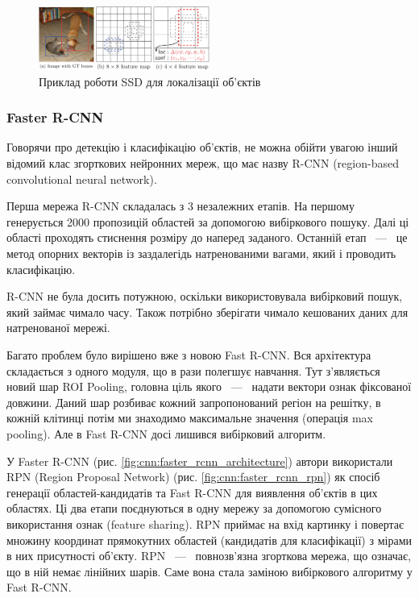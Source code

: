 \begin{figure}[H]
    \centering
    \includegraphics[width=0.5\textwidth]{images/cnn_ssd_work_example}
    \caption{Приклад роботи SSD для локалізації об'єктів \cite{bib:ssd}
        \label{fig:cnn:ssd_work_example}
    }
\end{figure}


\subsubsection{Faster R-CNN}

Говорячи про детекцію і класифікацію об'єктів, не можна обійти увагою інший відомий
клас згорткових нейронних мереж, що має назву R-CNN (region-based convolutional neural network).

Перша мережа R-CNN складалась з 3 незалежних етапів.
На першому генерується 2000 пропозицій областей за допомогою
вибіркового пошуку. Далі ці області проходять стиснення розміру до наперед заданого.
Останній етап ~---~ це метод опорних векторів із заздалегідь натренованими
вагами, який і проводить класифікацію.

R-CNN не була досить потужною, оскільки використовувала вибірковий пошук,
який займає чимало часу. Також потрібно зберігати чимало
кешованих даних для натренованої мережі.

Багато проблем було вирішено вже з новою Fast R-CNN. Вся архітектура складається з одного модуля,
що в рази полегшує навчання. Тут з'являється новий шар ROI Pooling, головна ціль якого ~---~
надати вектори ознак фіксованої довжини. Даний шар розбиває кожний запропонований
регіон на решітку, в кожній клітинці потім ми знаходимо максимальне значення
(операція max pooling). Але в Fast R-CNN досі
лишився вибірковий алгоритм.

У Faster R-CNN \cite{bib:faster_rcnn} (рис. \ref{fig:cnn:faster_rcnn_architecture}) автори 
використали RPN (Region Proposal Network) (рис. \ref{fig:cnn:faster_rcnn_rpn}) 
як спосіб генерації областей-кандидатів та Fast R-CNN для виявлення об'єктів в цих областях.
Ці два етапи поєднуються в одну мережу за допомогою сумісного використання ознак (feature sharing).
RPN приймає на вхід картинку і повертає множину координат прямокутних областей
(кандидатів для класифікації) з мірами в них присутності об'єкту. RPN ~---~ повнозв'язна
згорткова мережа, що означає, що в ній немає лінійних шарів. Саме вона стала заміною
вибіркового алгоритму у Fast R-CNN.

